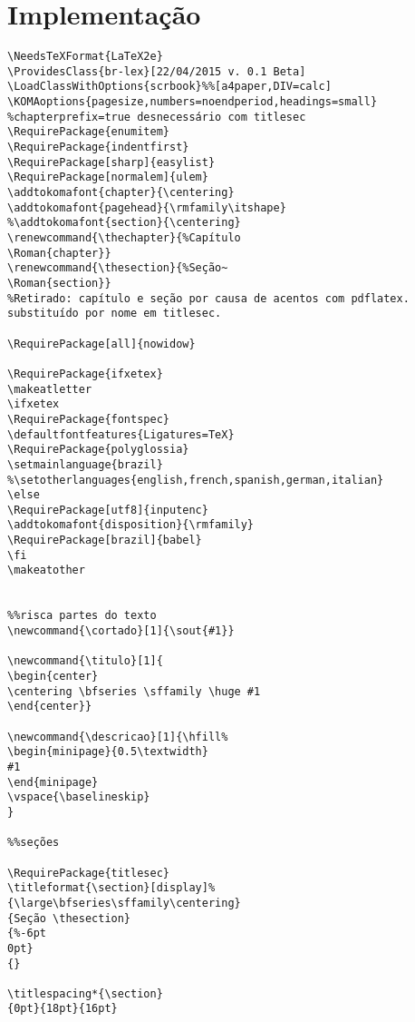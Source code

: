 \documentclass{ltxdoc}
\newcommand{\cortado}[1]{\sout{#1}}
\begin{document}
\section{Implementação}

\begin{lstlisting}
\NeedsTeXFormat{LaTeX2e}
\ProvidesClass{br-lex}[22/04/2015 v. 0.1 Beta]
\LoadClassWithOptions{scrbook}%%[a4paper,DIV=calc]
\KOMAoptions{pagesize,numbers=noendperiod,headings=small}
%chapterprefix=true desnecessário com titlesec
\RequirePackage{enumitem}
\RequirePackage{indentfirst}
\RequirePackage[sharp]{easylist}
\RequirePackage[normalem]{ulem}
\addtokomafont{chapter}{\centering}
\addtokomafont{pagehead}{\rmfamily\itshape}
%\addtokomafont{section}{\centering}
\renewcommand{\thechapter}{%Capítulo 
\Roman{chapter}}
\renewcommand{\thesection}{%Seção~
\Roman{section}}
%Retirado: capítulo e seção por causa de acentos com pdflatex. substituído por nome em titlesec.

\RequirePackage[all]{nowidow}

\RequirePackage{ifxetex}
\makeatletter
\ifxetex
\RequirePackage{fontspec}
\defaultfontfeatures{Ligatures=TeX}
\RequirePackage{polyglossia}
\setmainlanguage{brazil}
%\setotherlanguages{english,french,spanish,german,italian}
\else
\RequirePackage[utf8]{inputenc}
\addtokomafont{disposition}{\rmfamily}
\RequirePackage[brazil]{babel}
\fi
\makeatother


%%risca partes do texto
\newcommand{\cortado}[1]{\sout{#1}}

\newcommand{\titulo}[1]{
\begin{center}
\centering \bfseries \sffamily \huge #1
\end{center}}

\newcommand{\descricao}[1]{\hfill%
\begin{minipage}{0.5\textwidth}
#1
\end{minipage}
\vspace{\baselineskip}
}

%%seções

\RequirePackage{titlesec}
\titleformat{\section}[display]%
{\large\bfseries\sffamily\centering}
{Seção \thesection}
{%-6pt
0pt}
{}

\titlespacing*{\section}
{0pt}{18pt}{16pt}


\end{lstlisting}
\end{document}
